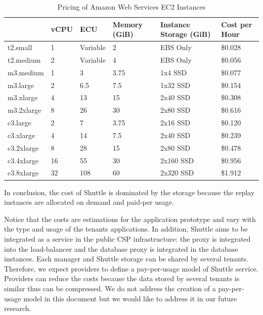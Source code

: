 \begin{table}
  \centering
   \begin{tabular}{|l|l|l|l|l|l|}
    \hline
                & vCPU  & \ac{ECU}         & Memory (GiB)  & Instance Storage (GiB)  & Cost per Hour \\ \hline
    t2.small    & 1     & Variable    & 2             & EBS Only                & \$0.028       \\ \hline
    t2.medium   & 2     & Variable    & 4             & EBS Only                & \$0.056       \\ \hline
    m3.medium   & 1     & 3           & 3.75          & 1x4 SSD                 & \$0.077       \\ \hline
    m3.large    & 2     & 6.5         & 7.5           & 1x32 SSD                & \$0.154       \\ \hline
    m3.xlarge   & 4     & 13          & 15            & 2x40 SSD                & \$0.308       \\ \hline
    m3.2xlarge  & 8     & 26          & 30            & 2x80 SSD                & \$0.616       \\ \hline
    c3.large    & 2     & 7           & 3.75          & 2x16 SSD                & \$0.120       \\ \hline
    c3.xlarge   & 4     & 14          & 7.5           & 2x40 SSD                & \$0.239       \\ \hline
    c3.2xlarge  & 8     & 28          & 15            & 2x80 SSD                & \$0.478       \\ \hline
    c3.4xlarge  & 16    & 55          & 30            & 2x160 SSD               & \$0.956       \\ \hline
    c3.8xlarge  & 32    & 108         & 60            & 2x320 SSD               & \$1.912       \\ \hline
    \end{tabular}
    \caption{Pricing of Amazon Web Services \ac{EC2} Instances }
    \label{tab:ec2Cost}
\end{table}

In conclusion, the cost of Shuttle is dominated by the storage because the replay instances are allocated on demand and paid-per usage.

Notice that the costs are estimations for the application prototype and vary with the type and usage of the tenants applications. In addition, Shuttle aims to be integrated as a service in the public \acf{CSP} infrastructure: the proxy is integrated into the load-balancer and the database proxy is integrated in the database instances. Each manager and Shuttle storage can be shared by several tenants. Therefore, we expect providers to define a pay-per-usage model of Shuttle service. Providers can reduce the costs because the data stored by several tenants is similar thus can be compressed. We do not address the creation of a pay-per-usage model in this document but we would like to address it in our future research.

